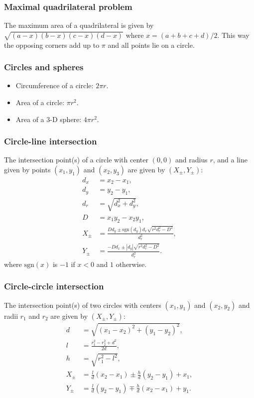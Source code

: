 \subsubsection{Maximal quadrilateral problem}
The maximum area of a quadrilateral is given by $\sqrt{(a-x)(b-x)(c-x)(d-x)}$ where $x = (a + b + c + d)/2$. This way the opposing corners add up to $\pi$ and all points lie on a circle.

\subsubsection{Circles and spheres}
\begin{itemize}
    \item Circumference of a circle: $2\pi r$.
    \item Area of a circle: $\pi r^2$.
    \item Area of a $3$-D sphere: $4\pi r^2$.
\end{itemize}

\subsubsection{Circle-line intersection}
The intersection point(s) of a circle with center $(0, 0)$ and radius $r$, and a line given by points $(x_1, y_1)$ and $(x_2, y_3)$ are given by $(X_\pm, Y_\pm)$:
\begin{align*}
    d_x &= x_2 - x_1, \\
    d_y &= y_2 - y_1, \\
    d_r &= \sqrt{d_x^2 + d_y^2}, \\
    D &= x_1y_2 - x_2y_1, \\
    X_\pm &= \frac{Dd_y \pm \text{sgn}(d_y)d_x\sqrt{r^2d_r^2 - D^2}}{d_r^2}, \\
    Y_\pm &= \frac{-Dd_x \pm |d_y|\sqrt{r^2d_r^2 - D^2}}{d_r^2}.
\end{align*}
where $\text{sgn}(x)$ is $-1$ if $x < 0$ and $1$ otherwise.

\subsubsection{Circle-circle intersection}
The intersection point(s) of two circles with centers $(x_1, y_1)$ and $(x_2, y_2)$ and radii $r_1$ and $r_2$ are given by $(X_\pm, Y_\pm)$:
\begin{align*}
    d &= \sqrt{(x_1 - x_2)^2 + (y_1 - y_2)^2}, \\
    l &= \frac{r_1^2 - r_2^2 + d^2}{2d}, \\
    h &= \sqrt{r_1^2 - l^2}, \\
    X_\pm &= \frac ld(x_2 - x_1) \pm \frac hd (y_2 - y_1) + x_1, \\
    Y_\pm &= \frac ld(y_2 - y_1) \mp \frac hd(x_2 - x_1) + y_1.
\end{align*}

